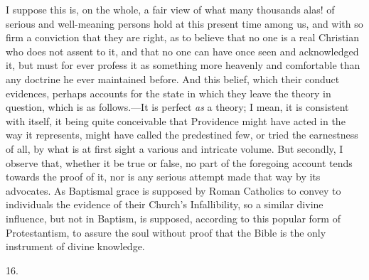 I suppose this is, on the whole, a fair view of what many thousands
alas! of serious and well-meaning persons hold at this present time
among us, and with so firm a conviction that they are right, as to
believe that no one is a real Christian who does not assent to it, and
that no one can have once seen and acknowledged it, but must for ever
profess it as something more heavenly and comfortable than any
doctrine he ever maintained before. And this belief, which their
conduct evidences, perhaps accounts for the state in which they leave
the theory in question, which is as follows.—It is perfect \emph{as}
a theory; I mean, it is consistent with itself, it being quite
conceivable that Providence might have acted in the way it represents,
might have called the predestined few, or tried the earnestness of
all, by what is at first sight a various and intricate volume. But
secondly, I observe that, whether it be true or false, no part of the
foregoing account tends towards the proof of it, nor is any serious
attempt made that way by its advocates. As Baptismal grace is supposed
by Roman Catholics to convey to individuals the evidence of their
Church's Infallibility, so a similar divine influence, but not in
Baptism, is supposed, according to this popular form of Protestantism,
to assure the soul without proof that the Bible is the only instrument
of divine knowledge.

16.

